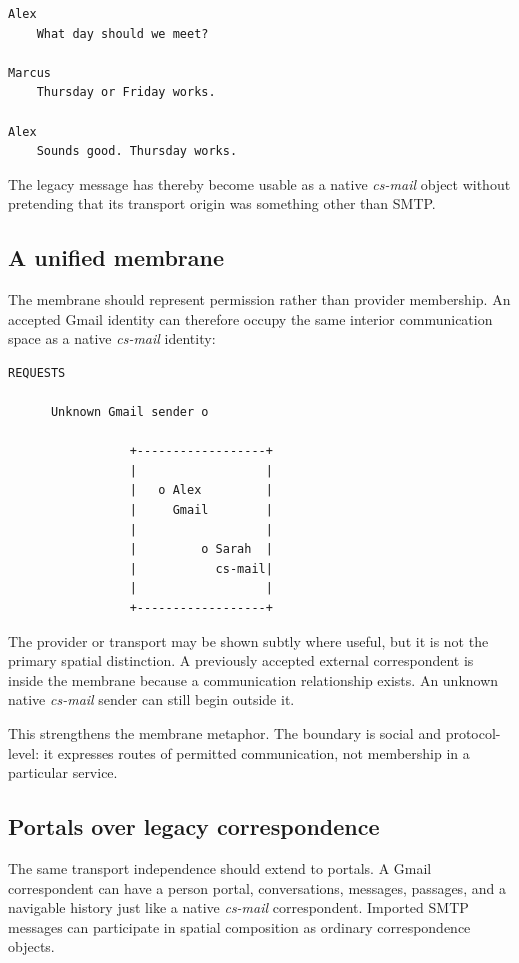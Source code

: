 \documentclass[11pt]{article}
\newcommand{\csmail}{\textit{cs-mail}}
\begin{document}
\begin{Verbatim}[fontsize=\small]
Alex
    What day should we meet?

Marcus
    Thursday or Friday works.

Alex
    Sounds good. Thursday works.
\end{Verbatim}

The legacy message has thereby become usable as a native \csmail{} object without pretending that its transport origin was something other than SMTP.

\subsection*{A unified membrane}

The membrane should represent permission rather than provider membership. An accepted Gmail identity can therefore occupy the same interior communication space as a native \csmail{} identity:

\begin{Verbatim}[fontsize=\small]
                         REQUESTS

      Unknown Gmail sender o

                 +------------------+
                 |                  |
                 |   o Alex         |
                 |     Gmail        |
                 |                  |
                 |         o Sarah  |
                 |           cs-mail|
                 |                  |
                 +------------------+
\end{Verbatim}

The provider or transport may be shown subtly where useful, but it is not the primary spatial distinction. A previously accepted external correspondent is inside the membrane because a communication relationship exists. An unknown native \csmail{} sender can still begin outside it.

This strengthens the membrane metaphor. The boundary is social and protocol-level: it expresses routes of permitted communication, not membership in a particular service.

\subsection*{Portals over legacy correspondence}

The same transport independence should extend to portals. A Gmail correspondent can have a person portal, conversations, messages, passages, and a navigable history just like a native \csmail{} correspondent. Imported SMTP messages can participate in spatial composition as ordinary correspondence objects.
\end{document}
